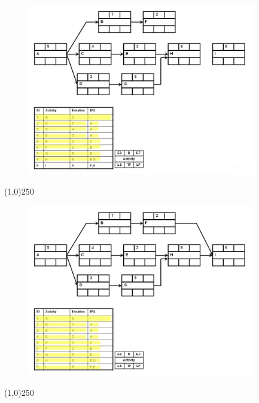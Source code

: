 \begin{frame}
\begin{figure}
	\centering
		\includegraphics[width = 10.0cm]{oldnotes/Slide138.jpg}
\end{figure}
\end{frame}
\begin{center}\line(1,0){250}\end{center}




\begin{frame}
\begin{figure}
	\centering
		\includegraphics[width = 10.0cm]{oldnotes/Slide139.jpg}
\end{figure}
\end{frame}
\begin{center}\line(1,0){250}\end{center}




